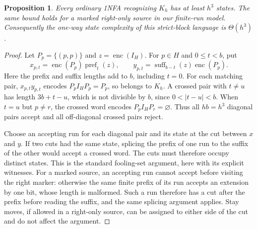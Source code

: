 \documentclass[11pt]{article}
\newtheorem{proposition}[theorem]{Proposition}
\newcommand{\enc}{\operatorname{enc}}
\newcommand{\pref}{\operatorname{pref}}
\newcommand{\suff}{\operatorname{suff}}
\begin{document}
\begin{proposition}\label{prop:cubic}
Every ordinary 1NFA recognizing $K_h$ has at least $h^3$ states. The same
bound holds for a marked right-only source in our finite-run model.
Consequently the one-way state complexity of this strict-block language
is $\Theta(h^3)$.
\end{proposition}
\begin{proof}
Let $P_p=\{(p,p)\}$ and $z=\enc(I_H)$. For $p\in H$ and $0\le t<b$, put
\[
 x_{p,t}=\enc(P_p)\pref_t(z),\qquad
 y_{p,t}=\suff_{b-t}(z)\enc(P_p).
\]
Here the prefix and suffix lengths add to $b$, including $t=0$.
For each matching pair, $x_{p,t}y_{p,t}$ encodes $P_p I_H P_p=P_p$,
so belongs to $K_h$. A crossed pair with $t\ne u$ has length
$3b+t-u$, which is not divisible by $b$, since $0<|t-u|<b$.
When $t=u$ but $p\ne r$, the crossed word encodes
$P_p I_H P_r=\varnothing$. Thus all $hb=h^3$ diagonal pairs accept and
all off-diagonal crossed pairs reject.

Choose an accepting run for each diagonal pair and its state at the cut
between $x$ and $y$. If two cuts had the same state, splicing the prefix
of one run to the suffix of the other would accept a crossed word.
The cuts must therefore occupy distinct states. This is the standard
fooling-set argument, here with its explicit witnesses.
For a marked source, an accepting run cannot accept before visiting the
right marker: otherwise the same finite prefix of its run accepts an
extension by one bit, whose length is malformed. Such a run therefore
has a cut after the prefix before reading the suffix, and the same
splicing argument applies. Stay moves, if allowed in a right-only source,
can be assigned to either side of the cut and do not affect the argument.
\end{proof}
\end{document}
